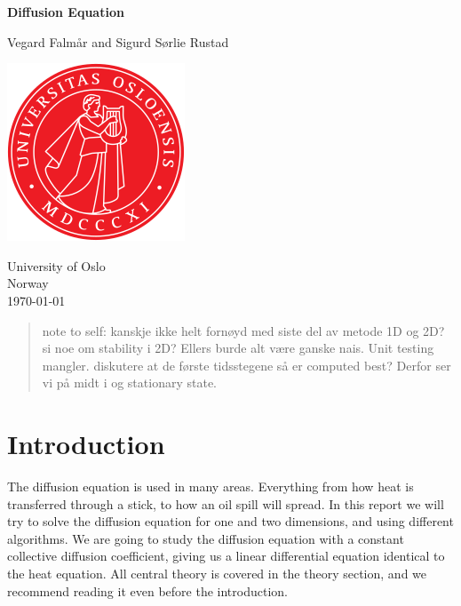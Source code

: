 \documentclass[reprint, english,notitlepage,nofootinbib]{revtex4-1}  %
\begin{document}
\begin{titlepage}
	\begin{center}
	\textbf{Diffusion Equation}

	\vspace{0.2cm}
	Vegard Falmår and Sigurd Sørlie Rustad

	\vspace{0.5cm}
	\includegraphics[scale=0.5]{../../pictures/UIO}
	\vspace{0.8cm}

	University of Oslo\\
	Norway\\
	\today	\\
	\end{center}
	\tableofcontents
	\clearpage
\end{titlepage}

\begin{abstract}
  note to self: kanskje ikke helt fornøyd med siste del av metode 1D og 2D? si noe om stability i 2D? Ellers burde alt være ganske nais. Unit testing mangler. diskutere at de første tidsstegene så er computed best? Derfor ser vi på midt i og stationary state.
\end{abstract}
\maketitle                              %


\section{Introduction}
The diffusion equation is used in many areas. Everything from how heat is transferred through a stick, to how an oil spill will spread. In this report we will try to solve the diffusion equation for one and two dimensions, and using different algorithms. We are going to study the diffusion equation with a constant collective diffusion coefficient, giving us a linear differential equation identical to the heat equation. All central theory is covered in the theory section, and we recommend reading it even before the introduction.
\end{document}
